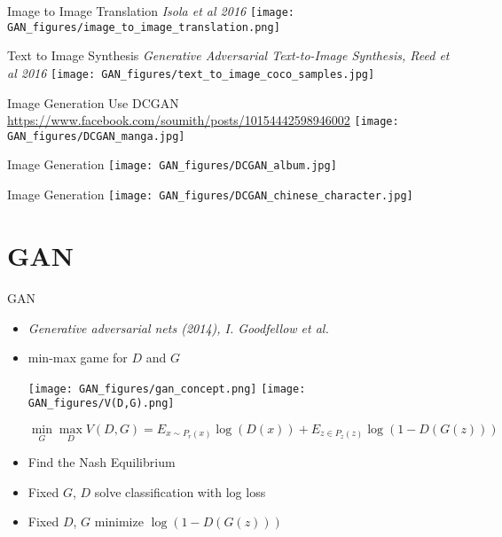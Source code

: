 \documentclass[9pt]{beamer}
\begin{document}
\begin{frame}{Image to Image Translation}
  \emph{Isola et al 2016}
  \texttt{[image: GAN\_figures/image\_to\_image\_translation.png]}
\end{frame}

\begin{frame}{Text to Image Synthesis}
  \emph{Generative Adversarial Text-to-Image Synthesis, Reed et al 2016}
  \texttt{[image: GAN\_figures/text\_to\_image\_coco\_samples.jpg]}
\end{frame}

\begin{frame}{Image Generation}
  Use DCGAN
  \url{https://www.facebook.com/soumith/posts/10154442598946002}
  \texttt{[image: GAN\_figures/DCGAN\_manga.jpg]}
\end{frame}

\begin{frame}{Image Generation}
  \texttt{[image: GAN\_figures/DCGAN\_album.jpg]}
\end{frame}

\begin{frame}{Image Generation}
  \texttt{[image: GAN\_figures/DCGAN\_chinese\_character.jpg]}
\end{frame}

\section{GAN}
\begin{frame}{GAN}
  \begin{itemize} 
  \item \emph{Generative adversarial nets (2014), I. Goodfellow et al.}
  \item min-max game for $D$ and $G$
    \begin{center}
      \texttt{[image: GAN\_figures/gan\_concept.png]}
      \texttt{[image: GAN\_figures/V(D,G).png]}
    \end{center}
  $$ \min_G \max_D V(D,G) = E_{x \sim P_r (x)} \log (D (x)) + E_{z \in P_z
    (z)} \log (1 - D (G (z))) $$
  \item Find the Nash Equilibrium
  \item Fixed $G$, $D$ solve classification with log loss
  \item Fixed $D$, $G$ minimize $\log(1-D(G(z)))$
  \end{itemize}
\end{frame}
\end{document}
